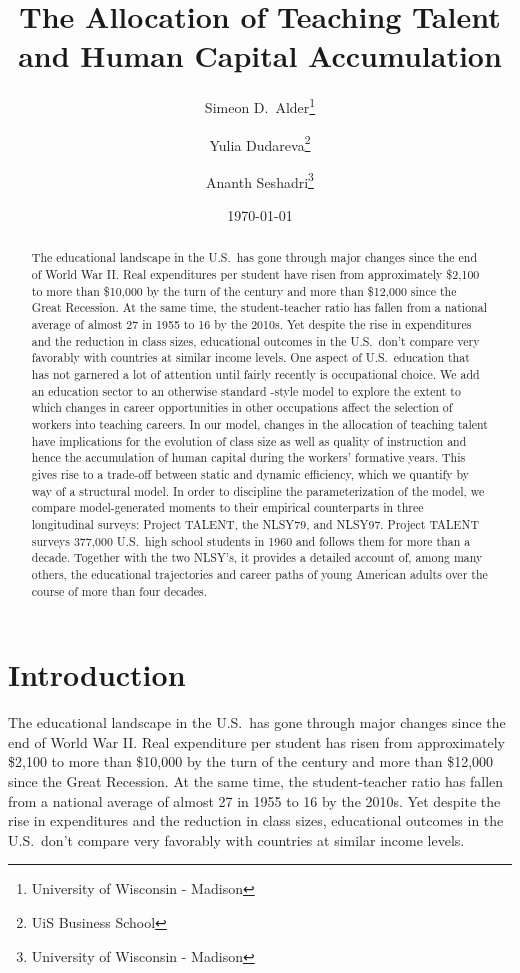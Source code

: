 \documentclass[onehalfspacing,11pt]{article}
\begin{document}
\begin{titlepage}
\title{The Allocation of Teaching Talent and Human Capital Accumulation}
\author{Simeon D.~Alder\footnote{University of Wisconsin - Madison} \and Yulia Dudareva\footnote{UiS Business School} \and Ananth Seshadri\footnote{University of Wisconsin - Madison}}
\date{\today}

\maketitle

\begin{abstract}
The educational landscape in the U.S.~has gone through major changes since the end of World War II. Real expenditures per student have risen from approximately \$2,100 to more than \$10,000 by the turn of the century and more than \$12,000 since the Great Recession. At the same time, the student-teacher ratio has fallen from a national average of almost 27 in 1955 to 16 by the 2010s. Yet despite the rise in expenditures and the reduction in class sizes, educational outcomes in the U.S.~don't compare very favorably with countries at similar income levels. One aspect of U.S.~education that has not garnered a lot of attention until fairly recently is occupational choice. We add an education sector to an otherwise standard \cite{Hsieh:2019}-style model to explore the extent to which changes in career opportunities in other occupations affect the selection of workers into teaching careers. In our model, changes in the allocation of teaching talent have implications for the evolution of class size as well as quality of instruction and hence the accumulation of human capital during the workers' formative years. This gives rise to a trade-off between static and dynamic efficiency, which we quantify by way of a structural model. In order to discipline the parameterization of the model, we compare model-generated moments to their empirical counterparts in three longitudinal surveys: Project TALENT, the NLSY79, and NLSY97. Project TALENT surveys 377,000 U.S.~high school students in 1960 and follows them for more than a decade. Together with the two NLSY's, it provides a detailed account of, among many others, the educational trajectories and career paths of young American adults over the course of more than four decades.
\end{abstract}
\end{titlepage}

\section{Introduction}
The educational landscape in the U.S.~has gone through major changes since the end of World War II. Real expenditure per student has risen from approximately \$2,100 to more than \$10,000 by the turn of the century and more than \$12,000 since the Great Recession. At the same time, the student-teacher ratio has fallen from a national average of almost 27 in 1955 to 16 by the 2010s. Yet despite the rise in expenditures and the reduction in class sizes, educational outcomes in the U.S.~don't compare very favorably with countries at similar income levels.
\end{document}
